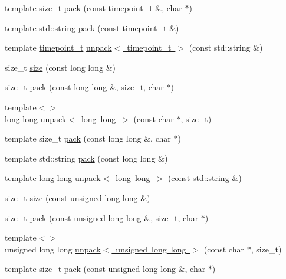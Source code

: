 \begin{DoxyCompactItemize}
\item 
template size\+\_\+t \mbox{\hyperlink{namespaceebml_a0292a5a59fc28b1537dcf2d1e2c9cf2d}{pack}} (const \mbox{\hyperlink{namespaceebml_a7e667ec3fe8b51fb5b8f9690734d8638}{timepoint\+\_\+t}} \&, char $\ast$)
\item 
template std\+::string \mbox{\hyperlink{namespaceebml_a5f46d1f43787604ff84e25a0115d08cd}{pack}} (const \mbox{\hyperlink{namespaceebml_a7e667ec3fe8b51fb5b8f9690734d8638}{timepoint\+\_\+t}} \&)
\item 
template \mbox{\hyperlink{namespaceebml_a7e667ec3fe8b51fb5b8f9690734d8638}{timepoint\+\_\+t}} \mbox{\hyperlink{namespaceebml_ac97339d25d5dab88390116547e0ef400}{unpack$<$ timepoint\+\_\+t $>$}} (const std\+::string \&)
\item 
size\+\_\+t \mbox{\hyperlink{namespaceebml_a54b33809097f683fb8345f9668e8237b}{size}} (const long long \&)
\item 
size\+\_\+t \mbox{\hyperlink{namespaceebml_ae32979c8cc295384d62cd00e9a256059}{pack}} (const long long \&, size\+\_\+t, char $\ast$)
\item 
{\footnotesize template$<$$>$ }\\long long \mbox{\hyperlink{namespaceebml_abb67ef3f7f8a4e21d3aa99d928dd715c}{unpack$<$ long long $>$}} (const char $\ast$, size\+\_\+t)
\item 
template size\+\_\+t \mbox{\hyperlink{namespaceebml_ac35ff5c48449c99a03dced64fdad8d9e}{pack}} (const long long \&, char $\ast$)
\item 
template std\+::string \mbox{\hyperlink{namespaceebml_a1c119d830a8a0d4f83e1362ade4c84ba}{pack}} (const long long \&)
\item 
template long long \mbox{\hyperlink{namespaceebml_aee739b2993a6e10f162ee2346d77d17c}{unpack$<$ long long $>$}} (const std\+::string \&)
\item 
size\+\_\+t \mbox{\hyperlink{namespaceebml_a6e2cf9e4800e8a09b5f4cb8de613ad77}{size}} (const unsigned long long \&)
\item 
size\+\_\+t \mbox{\hyperlink{namespaceebml_a71a18263f24d4160b1c97d74273745c7}{pack}} (const unsigned long long \&, size\+\_\+t, char $\ast$)
\item 
{\footnotesize template$<$$>$ }\\unsigned long long \mbox{\hyperlink{namespaceebml_a9631ff473950f82b6cb6302b2126d277}{unpack$<$ unsigned long long $>$}} (const char $\ast$, size\+\_\+t)
\item 
template size\+\_\+t \mbox{\hyperlink{namespaceebml_aefd18e43ba3909d196ab0bfa6d4ab640}{pack}} (const unsigned long long \&, char $\ast$)

\end{DoxyCompactItemize}
